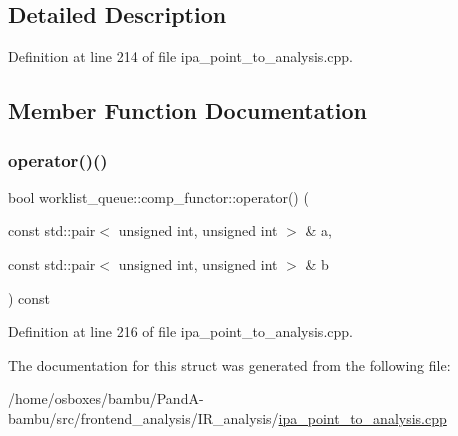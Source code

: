 \subsection{Detailed Description}


Definition at line 214 of file ipa\+\_\+point\+\_\+to\+\_\+analysis.\+cpp.



\subsection{Member Function Documentation}
\mbox{\label{structworklist__queue_1_1comp__functor_ae1123c54f73d732c0e418a8d356d3c38}} 
\subsubsection{\texorpdfstring{operator()()}{operator()()}}
{\footnotesize\ttfamily bool worklist\+\_\+queue\+::comp\+\_\+functor\+::operator() (\begin{DoxyParamCaption}\item[{const std\+::pair$<$ unsigned int, unsigned int $>$ \&}]{a,  }\item[{const std\+::pair$<$ unsigned int, unsigned int $>$ \&}]{b }\end{DoxyParamCaption}) const\hspace{0.3cm}{\ttfamily [inline]}}



Definition at line 216 of file ipa\+\_\+point\+\_\+to\+\_\+analysis.\+cpp.



The documentation for this struct was generated from the following file\+:\begin{DoxyCompactItemize}
\item 
/home/osboxes/bambu/\+Pand\+A-\/bambu/src/frontend\+\_\+analysis/\+I\+R\+\_\+analysis/\hyperlink{ipa__point__to__analysis_8cpp}{ipa\+\_\+point\+\_\+to\+\_\+analysis.\+cpp}\end{DoxyCompactItemize}
